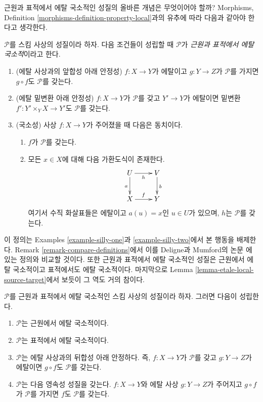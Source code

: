 \noindent
근원과 표적에서 에탈 국소적인 성질의 올바른 개념은 무엇이어야 할까?
Morphisms, Definition \ref{morphisms-definition-property-local}과의
유추에 따라 다음과 같아야 한다고 생각한다.

\begin{definition}
\label{definition-local-source-target}
$\mathcal{P}$를 스킴 사상의 성질이라 하자. 다음 조건들이 성립할 때
$\mathcal{P}$가 {\it 근원과 표적에서 에탈 국소적}이라고 한다.
\begin{enumerate}
\item (에탈 사상과의 앞합성 아래 안정성)
$f : X \to Y$가 에탈이고 $g : Y \to Z$가 $\mathcal{P}$를 가지면
$g \circ f$도 $\mathcal{P}$를 갖는다.
\item (에탈 밑변환 아래 안정성)
$f : X \to Y$가 $\mathcal{P}$를 갖고 $Y' \to Y$가 에탈이면 밑변환
$f' : Y' \times_Y X \to Y'$도 $\mathcal{P}$를 갖는다.
\item (국소성) 사상 $f : X \to Y$가 주어졌을 때 다음은 동치이다.
\begin{enumerate}
\item $f$가 $\mathcal{P}$를 갖는다.
\item 모든 $x \in X$에 대해 다음 가환도식이 존재한다.
$$
\xymatrix{
U \ar[d]_a \ar[r]_h & V \ar[d]^b \\
X \ar[r]^f & Y
}
$$
여기서 수직 화살표들은 에탈이고 $a(u) = x$인 $u \in U$가 있으며,
$h$는 $\mathcal{P}$를 갖는다.
\end{enumerate}
\end{enumerate}
\end{definition}

\noindent
이 정의는 Examples \ref{example-silly-one}과
\ref{example-silly-two}에서 본 행동을 배제한다. Remark
\ref{remark-compare-definitions}에서 이를 Deligne과 Mumford의 논문
\cite{DM}에 있는 정의와 비교할 것이다. 또한 근원과 표적에서 에탈
국소적인 성질은 근원에서 에탈 국소적이고 표적에서도 에탈 국소적이다.
마지막으로 Lemma \ref{lemma-etale-local-source-target}에서 보듯이
그 역도 거의 참이다.

\begin{lemma}
\label{lemma-local-source-target-implies}
$\mathcal{P}$를 근원과 표적에서 에탈 국소적인 스킴 사상의 성질이라
하자. 그러면 다음이 성립한다.
\begin{enumerate}
\item $\mathcal{P}$는 근원에서 에탈 국소적이다.
\item $\mathcal{P}$는 표적에서 에탈 국소적이다.
\item $\mathcal{P}$는 에탈 사상과의 뒤합성 아래 안정하다. 즉,
$f : X \to Y$가 $\mathcal{P}$를 갖고 $g : Y \to Z$가 에탈이면
$g \circ f$도 $\mathcal{P}$를 갖는다.
\item $\mathcal{P}$는 다음 영속성 성질을 갖는다. $f : X \to Y$와
에탈 사상 $g : Y \to Z$가 주어지고 $g \circ f$가 $\mathcal{P}$를
가지면 $f$도 $\mathcal{P}$를 갖는다.
\end{enumerate}
\end{lemma}

